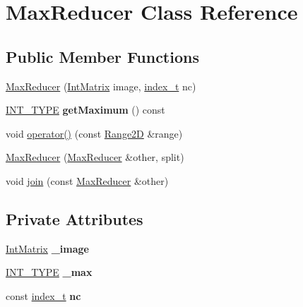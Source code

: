 \hypertarget{class_max_reducer}{
\section{MaxReducer Class Reference}
\label{class_max_reducer}
}
\subsection*{Public Member Functions}
\begin{CompactItemize}
\item 
\hyperlink{class_max_reducer_15429c52ea4767f8c4ed60530814a924}{MaxReducer} (\hyperlink{cowichan_8hpp_82321152ddeeefe9c61350a42ed9e7af}{IntMatrix} image, \hyperlink{cowichan_8hpp_5b04577d5d21124855deaad298595371}{index\_\-t} nc)
\item 
\hypertarget{class_max_reducer_de8cd5f464b4287fab14fdbe7b701452}{
\hyperlink{cowichan_8hpp_c96945095fd0ce7186a1d00a89f77d2c}{INT\_\-TYPE} \textbf{getMaximum} () const }
\label{class_max_reducer_de8cd5f464b4287fab14fdbe7b701452}

\item 
void \hyperlink{class_max_reducer_80d53943773b8909921c53a2f094d078}{operator()} (const \hyperlink{cowichan__tbb_8hpp_e591b8e6980ddc5982ee22655da2ab8e}{Range2D} \&range)
\item 
\hyperlink{class_max_reducer_7c2c70197b7e05eb9ecacf0db0b8b3b4}{MaxReducer} (\hyperlink{class_max_reducer}{MaxReducer} \&other, split)
\item 
void \hyperlink{class_max_reducer_095078ad7a356586f27a79a97fc40ac9}{join} (const \hyperlink{class_max_reducer}{MaxReducer} \&other)
\end{CompactItemize}
\subsection*{Private Attributes}
\begin{CompactItemize}
\item 
\hypertarget{class_max_reducer_90f7cb1f4a7460c19caf4419a0ae1c06}{
\hyperlink{cowichan_8hpp_82321152ddeeefe9c61350a42ed9e7af}{IntMatrix} \textbf{\_\-image}}
\label{class_max_reducer_90f7cb1f4a7460c19caf4419a0ae1c06}

\item 
\hypertarget{class_max_reducer_8635ce5b2d81812d4a7ddc051c961886}{
\hyperlink{cowichan_8hpp_c96945095fd0ce7186a1d00a89f77d2c}{INT\_\-TYPE} \textbf{\_\-max}}
\label{class_max_reducer_8635ce5b2d81812d4a7ddc051c961886}

\item 
\hypertarget{class_max_reducer_c640e0798bc41ef929aa907cc94cec48}{
const \hyperlink{cowichan_8hpp_5b04577d5d21124855deaad298595371}{index\_\-t} \textbf{nc}}
\label{class_max_reducer_c640e0798bc41ef929aa907cc94cec48}

\end{CompactItemize}


